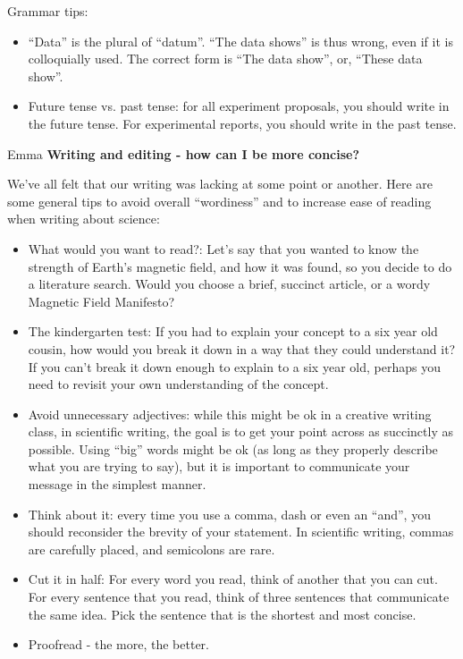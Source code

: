 Grammar tips: %
\begin{itemize}
\item ``Data'' is the plural of ``datum''. ``The data shows'' is thus wrong, even if it is colloquially used. The correct form is ``The data show'', or, ``These data show''.
\item Future tense vs. past tense: for all experiment proposals, you should write in the future tense. For experimental reports, you should write in the past tense. 
\end{itemize}

\begin{studentOpinion}{Emma}
\textbf{Writing and editing - how can I be more concise?}

We've all felt that our writing was lacking at some point or another. Here are some general tips to avoid overall ``wordiness'' and to increase ease of reading when writing about science: 

\begin{itemize}
\item What would you want to read?: Let's say that you wanted to know the strength of Earth's magnetic field, and how it was found, so you decide to do a literature search. Would you choose a brief, succinct article, or a wordy Magnetic Field Manifesto?
\item The kindergarten test: If you had to explain your concept to a six year old cousin, how would you break it down in a way that they could understand it? If you can't break it down enough to explain to a six year old, perhaps you need to revisit your own understanding of the concept.
\item Avoid unnecessary adjectives: while this might be ok in a creative writing class, in scientific writing, the goal is to get your point across as succinctly as possible. Using ``big'' words might be ok (as long as they properly describe what you are trying to say), but it is important to communicate your message in the simplest manner. 
\item Think about it: every time you use a comma, dash or even an ``and'', you should reconsider the brevity of your statement. In scientific writing, commas are carefully placed, and semicolons are rare. 
\item Cut it in half: For every word you read, think of another that you can cut. For every sentence that you read, think of three sentences that communicate the same idea. Pick the sentence that is the shortest and most concise. 
\item Proofread - the more, the better.
\end{itemize}
\end{studentOpinion}

